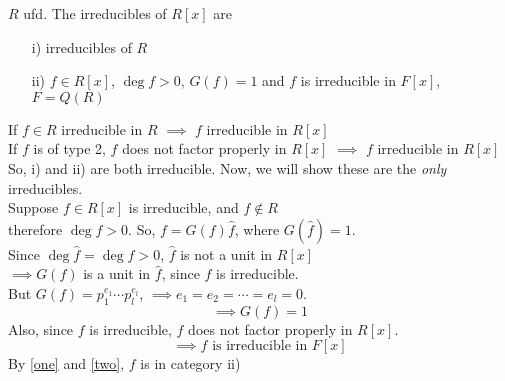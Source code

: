 \thm $R$ ufd.  The irreducibles of $R[x]$ are
\begin{enumerate}
\item[i)] irreducibles of $R$
\item[ii)] $f\in R[x]$, $\deg f>0$, $G(f)=1$ and $f$ is irreducible in $F[x]$, $F=Q(R)$
\end{enumerate}
\pf If $f\in R$ irreducible in $R$ $\implies$ $f$ irreducible in $R[x]$ \\
If $f$ is of type 2, $f$ does not factor properly in $R[x]$ $\implies$ $f$ irreducible in $R[x]$ \\
So, i) and ii) are both irreducible.  Now, we will show these are the \emph{only} irreducibles. \\
Suppose $f\in R[x]$ is irreducible, and $f\notin R$ \\
therefore $\deg f>0$.  So, $f=G(f)\hat f$, where $G(\hat f)=1$. \\
Since $\deg\hat f=\deg f>0$, $\hat f$ is not a unit in $R[x]$ \\
$\implies G(f)$ is a unit in $\hat f$, since $f$ is irreducible. \\
But $G(f)=p_1^{e_1}\dotsm p_l^{e_l}$, $\implies e_1=e_2=\dotsb=e_l=0$.
\[ \implies G(f)=1 \label{one}\tag{1} \]
Also, since $f$ is irreducible, $f$ does not factor properly in $R[x]$.
\[ \implies \text{$f$ is irreducible in $F[x]$} \label{two}\tag{2} \]
By \eqref{one} and \eqref{two}, $f$ is in category ii)

